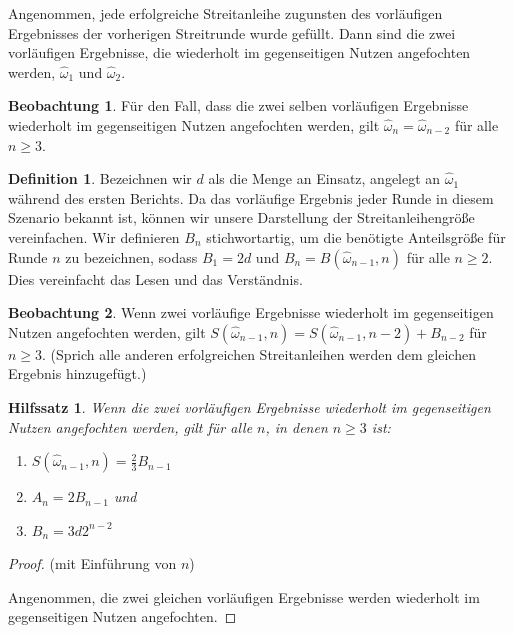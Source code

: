 \documentclass[floatfix,reprint,nofootinbib,amsmath,amssymb,epsfig,pre,floats,letterpaper,groupedaffiliation]{revtex4-1}
\newtheorem{lemma}[theorem]{Hilfssatz}
\theoremstyle{definition}
\newtheorem{observation}{Beobachtung}
\theoremstyle{definition}
\newtheorem{definition}{Definition}
\theoremstyle{definition}
\begin{document}
\begin{appendix}
Angenommen, jede erfolgreiche Streitanleihe zugunsten des vorläufigen Ergebnisses der vorherigen Streitrunde wurde gefüllt. Dann sind die zwei vorläufigen Ergebnisse, die wiederholt im gegenseitigen Nutzen angefochten werden, $\hat{\omega}_{1}$ und $\hat{\omega}_{2}$.

\begin{observation}\label{ob:tentative_outcomes_repeat}
Für den Fall, dass die zwei selben vorläufigen Ergebnisse wiederholt im gegenseitigen Nutzen angefochten werden, gilt $\hat{\omega}_{n} = \hat{\omega}_{n-2}$ für alle $n \geq 3$.
\end{observation}

\begin{definition}
Bezeichnen wir $d$ als die Menge an Einsatz, angelegt an $\hat{\omega}_{1}$ während des ersten Berichts. Da das vorläufige Ergebnis jeder Runde in diesem Szenario bekannt ist, können wir unsere Darstellung der Streitanleihengröße vereinfachen. Wir definieren $B_n$ stichwortartig, um die benötigte Anteilsgröße für Runde $n$ zu bezeichnen, sodass $B_{1} = 2d$ und $B_{n} = B(\hat{\omega}_{n-1},n)$ für alle $n \geq 2$. Dies vereinfacht das Lesen und das Verständnis.
\end{definition}

\begin{observation}\label{ob:every_other_dispute_stake_applies_to_same_outcome}
Wenn zwei vorläufige Ergebnisse wiederholt im gegenseitigen Nutzen angefochten werden, gilt $S(\hat{\omega}_{n-1},n) = S(\hat{\omega}_{n-1},n-2) + B_{n-2}$ für $n \geq 3$. (Sprich alle anderen erfolgreichen Streitanleihen werden dem gleichen Ergebnis hinzugefügt.)
\end{observation}

\begin{lemma}\label{le:bond_sizes}
Wenn die zwei vorläufigen Ergebnisse wiederholt im gegenseitigen Nutzen angefochten werden, gilt für alle $n$, in denen $n \geq 3$ ist:
\begin{enumerate}
\item{$S(\hat{\omega}_{n-1},n)=\frac{2}{3}B_{n-1}$}
\item{$A_{n} = 2B_{n-1}$ und}
\item{$B_{n} = 3d2^{n-2}$}
\end{enumerate}
\end{lemma}

\begin{proof}
(mit Einführung von $n$)

Angenommen, die zwei gleichen vorläufigen Ergebnisse werden wiederholt im gegenseitigen Nutzen angefochten.


\end{proof}
\end{appendix}
\end{document}
